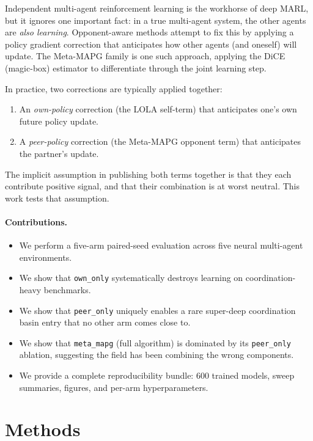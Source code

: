 \documentclass[11pt,a4paper]{article}
\newcommand{\arm}[1]{\texttt{#1}}
\begin{document}
Independent multi-agent reinforcement learning is the workhorse of deep MARL, but it ignores one important fact: in a true multi-agent system, the other agents are \emph{also learning}.
Opponent-aware methods \cite{Foerster2017LOLA,Kim2021MetaMAPG} attempt to fix this by applying a policy gradient correction that anticipates how other agents (and oneself) will update.
The Meta-MAPG family is one such approach, applying the DiCE (magic-box) estimator \cite{Foerster2018DiCE} to differentiate through the joint learning step.

In practice, two corrections are typically applied together:
\begin{enumerate}
    \item An \emph{own-policy} correction (the LOLA self-term) that anticipates one's own future policy update.
    \item A \emph{peer-policy} correction (the Meta-MAPG opponent term) that anticipates the partner's update.
\end{enumerate}

The implicit assumption in publishing both terms together is that they each contribute positive signal, and that their combination is at worst neutral.
This work tests that assumption.

\paragraph{Contributions.}
\begin{itemize}
    \item We perform a five-arm paired-seed evaluation across five neural multi-agent environments.
    \item We show that \arm{own\_only} systematically destroys learning on coordination-heavy benchmarks.
    \item We show that \arm{peer\_only} uniquely enables a rare super-deep coordination basin entry that no other arm comes close to.
    \item We show that \arm{meta\_mapg} (full algorithm) is dominated by its \arm{peer\_only} ablation, suggesting the field has been combining the wrong components.
    \item We provide a complete reproducibility bundle: 600 trained models, sweep summaries, figures, and per-arm hyperparameters.
\end{itemize}

\section{Methods}\label{sec:methods}
\end{document}
